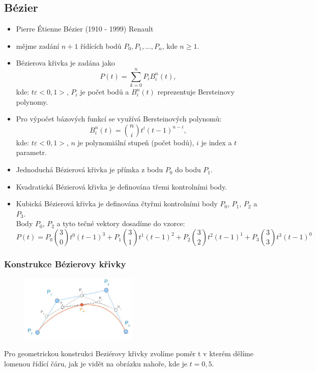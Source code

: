 \subsection{Bézier}
\begin{itemize}
	\item Pierre Étienne Bézier (1910 - 1999) Renault
	\item mějme zadání $n + 1$ řídících bodů $P_0, P_1,...,P_n$, kde $n \geq 1$.
	\item Bézierova křivka je zadána jako
			\begin{equation*} 
			P(t) = \sum\limits_{k=0}^n P_{i} B_{i}^{n}(t),
			\end{equation*}
			kde: $t \varepsilon <0,1>$, $P_{i}$ je počet bodů a $B_{i}^{n}(t)$ reprezentuje Bersteinovy polynomy. 
	\item Pro výpočet bázových funkcí se využívá Bersteinových polynomů:
			\begin{equation*} 
			B_{i}^{n}(t) = \binom{n}{i} t^{i} (t - 1)^{n-i},
			\end{equation*}
			kde: $t \varepsilon <0,1>$, $n$ je polynomiální stupeň (počet bodů), $i$ je index a $t$ parametr. 
	\item Jednoduchá Bézierová křivka je přímka z bodu $P_{0}$ do bodu $P_{1}$.
	\item Kvadratická Bézierová křivka je definována třemi kontrolními body.
	\item Kubická Bézierová křivka je definována čtyřmi kontrolními body $P_{0}$, $P_{1}$, $P_{2}$ a $P_{3}$. \\
	Body $P_{0}$, $P_{2}$ a tyto tečné vektory dosadíme do vzorce: 
	\begin{equation*} 
	P(t) = P_{0} \binom{3}{0} t^{0} (t - 1)^{3} + P_{1} \binom{3}{1} t^{1} (t - 1)^{2} + P_{2} \binom{3}{2} t^{2} (t - 1)^{1} + P_{3} \binom{3}{3} t^{3} (t - 1)^{0}
	\end{equation*}
\end{itemize}

\subsubsection*{Konstrukce Bézierovy křivky}
\begin{figure}[H]
\centering
\includegraphics[width=0.5\textwidth]{assets/2_bezier_ex}
\end{figure}
Pro geometrickou konstrukci Beziérovy křivky zvolíme poměr t v kterém dělíme lomenou řídící čáru, jak je vidět na obrázku nahoře, kde je $t=0,5$. 

